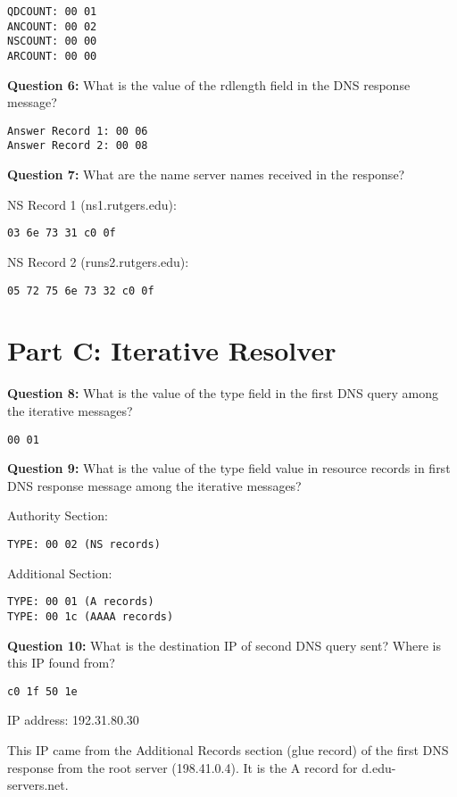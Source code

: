 \documentclass[11pt]{article}
\begin{document}
\begin{lstlisting}
QDCOUNT: 00 01
ANCOUNT: 00 02
NSCOUNT: 00 00
ARCOUNT: 00 00
\end{lstlisting}

\vspace{0.3cm}

\textbf{Question 6:} What is the value of the rdlength field in the DNS response message?

\begin{lstlisting}
Answer Record 1: 00 06
Answer Record 2: 00 08
\end{lstlisting}

\vspace{0.3cm}

\textbf{Question 7:} What are the name server names received in the response?

NS Record 1 (ns1.rutgers.edu):
\begin{lstlisting}
03 6e 73 31 c0 0f
\end{lstlisting}

NS Record 2 (runs2.rutgers.edu):
\begin{lstlisting}
05 72 75 6e 73 32 c0 0f
\end{lstlisting}

\vspace{0.5cm}

\section*{Part C: Iterative Resolver}

\textbf{Question 8:} What is the value of the type field in the first DNS query among the iterative messages?

\begin{lstlisting}
00 01
\end{lstlisting}

\vspace{0.3cm}

\textbf{Question 9:} What is the value of the type field value in resource records in first DNS response message among the iterative messages?

Authority Section:
\begin{lstlisting}
TYPE: 00 02 (NS records)
\end{lstlisting}

Additional Section:
\begin{lstlisting}
TYPE: 00 01 (A records)
TYPE: 00 1c (AAAA records)
\end{lstlisting}

\vspace{0.3cm}

\textbf{Question 10:} What is the destination IP of second DNS query sent? Where is this IP found from?

\begin{lstlisting}
c0 1f 50 1e
\end{lstlisting}
IP address: 192.31.80.30

This IP came from the Additional Records section (glue record) of the first DNS response from the root server (198.41.0.4). It is the A record for d.edu-servers.net.
\end{document}
